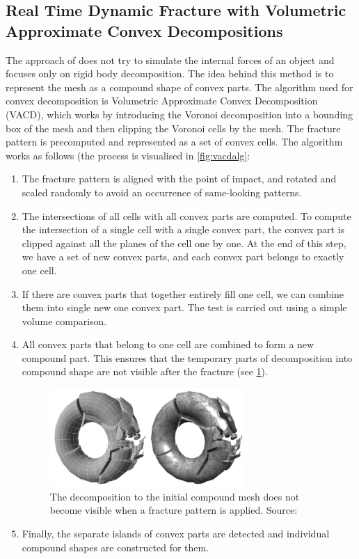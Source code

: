 \subsection{Real Time Dynamic Fracture
with Volumetric Approximate Convex Decompositions}
\label{sec:RTDF}
The approach of \citet{nvidia} does not try to simulate the internal forces of an object and focuses only on rigid body decomposition. The idea behind this method is to represent the mesh as a compound shape of convex parts. The algorithm used for convex decomposition is Volumetric Approximate Convex Decomposition (VACD), which works by introducing the Voronoi decomposition into a bounding box of the mesh and then clipping the Voronoi cells by the mesh. The fracture pattern  is precomputed and represented as a set of convex cells. The algorithm works as follows (the process is visualised in \cref{fig:vacdalg}:
\begin{enumerate}
\item The fracture pattern is aligned with the point of impact, and rotated and scaled randomly to avoid an occurrence of same-looking patterns.
\item The intersections of all cells with all convex parts are computed. To compute the intersection of a single cell with a single convex part, the convex part is clipped against all the planes of the cell one by one. 
At the end of this step, we have a set of new convex parts, and each convex part belongs to exactly one cell.
\item If there are convex parts that together entirely fill one cell, we can combine them into single new one convex part. The test is carried out using a simple volume comparison.
\item All convex parts that belong to one cell are combined to form a new compound part. This ensures that the temporary parts of decomposition into compound shape are not visible after the fracture (see \cref{fig:vacdfracture}).
\begin{figure}
        \centering
        \includegraphics[width=0.7\textwidth]{img/vacdfracture}
        \caption{The decomposition to the
initial compound mesh does not become visible when a fracture
pattern is applied. Source: \citet{nvidia}}
        \label{fig:vacdfracture}
\end{figure}
\item Finally, the separate islands of convex parts are detected and individual compound shapes are constructed for them.
\end{enumerate}

